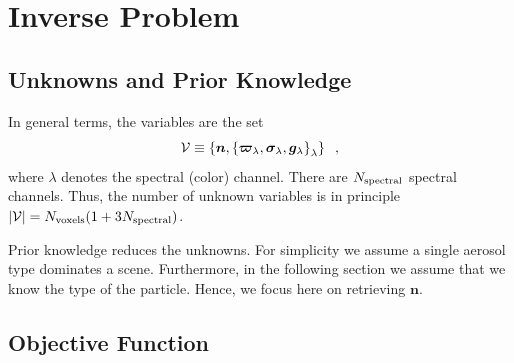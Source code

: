 \documentclass[10pt,letterpaper]{article}
\newcommand{\vect}[1]{\bm{#1}}
\begin{document}
\section{Inverse Problem}
\label{sec:inverse-problem}


\subsection{Unknowns and Prior Knowledge}
\label{sec:prior}

In general terms, the variables are the set
\begin{equation}
  {\cal V}\equiv
  \left\{
    {\bm n},
    \left\{
      \vect{\varpi}_{\lambda},\vect{\sigma}_{\lambda},{\bm g}_{\lambda}
    \right\}_{\lambda}
  \right\}
  \;\;,
  \label{eq:calV}
\end{equation}
where $\lambda$ denotes the spectral (color) channel.  There are
$N_{\rm spectral}$ spectral channels.  Thus, the number of unknown
variables is in principle \mbox{$|{\cal V}|=N_{\rm voxels}(1+3N_{\rm
    spectral})$}.

Prior knowledge reduces the unknowns. For simplicity we assume a
single aerosol type dominates a scene. Furthermore, in the following
section we assume that we know the type of the particle. Hence, we
focus here on retrieving ${\bm n}$.


\subsection{Objective Function}
\label{sec:objective-function}
\end{document}

